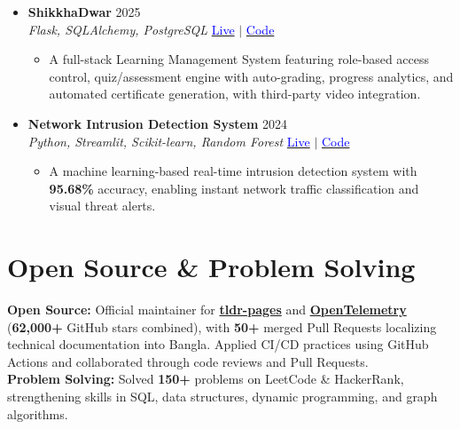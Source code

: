 \documentclass[a4paper]{article}
\newcommand{\resumeItem}[1]{
  \item\small{
    {#1 \vspace{-2pt}}
  }
}
\newcommand{\resumeItemListStart}{\begin{itemize}}
\newcommand{\resumeItemListEnd}{\end{itemize}\vspace{-5pt}}
\begin{document}
\begin{itemize}[leftmargin=0.15in, label={}, itemsep=6pt]
    \item
    \textbf{ShikkhaDwar} \hfill 2025\\
    \small\textit{Flask, SQLAlchemy, PostgreSQL} \hfill
    \href{https://shikkhadwar-81r2.onrender.com/}{\textcolor{blue}{Live}} $|$
    \href{https://github.com/nihal-kabir/ShikkhaDwar}{\textcolor{blue}{Code}}\normalsize
    \vspace{-5pt}
    \resumeItemListStart
      \resumeItem{A full-stack Learning Management System featuring role-based access control, quiz/assessment engine with auto-grading, progress analytics, and automated certificate generation, with third-party video integration.}
    \resumeItemListEnd



    \item
    \textbf{Network Intrusion Detection System} \hfill 2024\\
    \small\textit{Python, Streamlit, Scikit-learn, Random Forest} \hfill
    \href{https://ml-ids.streamlit.app/}{\textcolor{blue}{Live}} $|$
    \href{https://github.com/debjotyms/streamlit-ml-intrusion-detection-system}{\textcolor{blue}{Code}}\normalsize
    \vspace{-5pt}
    \resumeItemListStart
      \resumeItem{A machine learning-based real-time intrusion detection system with \textbf{95.68\%} accuracy, enabling instant network traffic classification and visual threat alerts.}
\resumeItemListEnd

  \end{itemize}


\section{Open Source \& Problem Solving}
\begin{itemize}[leftmargin=0.15in, label={}]
\small{\item{
\textbf{Open Source:} Official maintainer for \textbf{\href{https://github.com/tldr-pages/tldr}{tldr-pages}} and \textbf{\href{https://github.com/open-telemetry}{OpenTelemetry}} (\textbf{62,000+} GitHub stars combined), with \textbf{50+} merged Pull Requests localizing technical documentation into Bangla. Applied CI/CD practices using GitHub Actions and collaborated through code reviews and Pull Requests.\\
\textbf{Problem Solving:} Solved \textbf{150+} problems on LeetCode \& HackerRank, strengthening skills in SQL, data structures, dynamic programming, and graph algorithms.
}}
\end{itemize}
\end{document}
